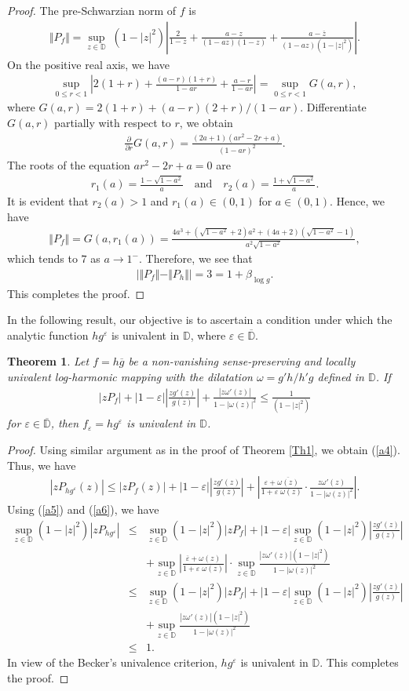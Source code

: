 \documentclass[12pt,reqno]{amsart}
\newtheorem{thm}{Theorem}[section]
\newtheorem{open problem}{Open problem}[section]
\newcommand{\ol}{\overline}
\newcommand{\beas}{\begin{eqnarray*}}
\newcommand{\eeas}{\end{eqnarray*}}
\newcommand{\bea}{\begin{eqnarray}}
\newcommand{\eea}{\end{eqnarray}}
\renewcommand{\epsilon}{\varepsilon}
\numberwithin{equation}{section}
\begin{document}
\begin{proof}
The pre-Schwarzian norm of $f$ is 
\beas\Vert P_f\Vert=\sup_{z\in\mathbb{D}}\;(1-|z|^2)\left|\frac{2}{1-z}+\frac{a-z}{(1-az)(1-z)}+\frac{a-\ol{z}}{(1-az)(1-|z|^2)}\right|.\eeas
On the positive real axis, we have 
\beas \sup_{0\leq r<1}\left|2(1+r)+\frac{(a-r)(1+r)}{1-a r}+\frac{a-r}{1-a r}\right|=\sup_{0\leq r<1}G(a, r),\eeas
where $G(a,r)=2(1+r)+(a-r)(2+r)/(1-a r)$. Differentiate $G(a, r)$ partially with respect to $r$, we obtain
\beas \frac{\partial }{\partial r}G(a, r)=\frac{\left(2 a+1\right)\left(a r^2-2 r+a\right)}{(1-a r)^2}.\eeas
The roots of the equation $a r^2-2 r+a=0$ are 
\beas r_1(a)=\frac{1-\sqrt{1-a^2}}{a}\quad\text{and}\quad r_2(a)=\frac{1+\sqrt{1-a^2}}{a}.\eeas
It is evident that $r_2(a)>1$ and $r_1(a)\in(0, 1)$ for $a\in(0, 1)$. Hence, we have  
\beas\Vert P_f\Vert=G(a, r_1(a))=\frac{4 a^3+\left(\sqrt{1-a^2}+2\right) a^2+(4a+2) \left(\sqrt{1-a^2}-1\right)}{a^2 \sqrt{1-a^2}},\eeas
which tends to $7$ as $a\to1^-$. Therefore, we see that 
\beas \left|\Vert P_f \Vert -\Vert P_{h}\Vert \right|=3= 1+\beta_{\log{g}}.\eeas
This completes the proof.
\end{proof}
In the following result, our objective is to ascertain a condition under which the analytic function $hg^\epsilon$ is univalent in $\mathbb{D}$, where $\epsilon\in\ol{\mathbb{D}}$.
\begin{thm}\label{Th4}
Let $f=h\overline{g}$ be a non-vanishing sense-preserving and locally univalent log-harmonic mapping with the dilatation $\omega=g'h/h'g$ defined in $\mathbb{D}$. If 
\bea\label{a5} |z P_{f}|+|1-\epsilon|\left|\frac{z g'(z)}{g(z)}\right|+\frac{|z \omega'(z)|}{1-|\omega(z)|^2}\leq \frac{1}{(1-|z|^2)}\eea
for $\epsilon\in\ol{\mathbb{D}}$, then $f_\epsilon=hg^\epsilon$ is univalent in $\mathbb{D}$.
\end{thm}
\begin{proof}
Using similar argument as in the proof of \textrm{Theorem} \ref{Th1}, we obtain (\ref{a4}). Thus, we have
\bea\label{a6}
\left|zP_{hg^{\epsilon}}(z)\right|\leq\left|zP_f(z)\right|+|1-\epsilon|\left|\frac{zg'(z)}{g(z)}\right|+\left|\frac{\epsilon+\ol{\omega(z)} }{1+\epsilon\;\omega(z) }\cdot\frac{z\omega'(z)}{1-|\omega(z)|^2}\right|.\eea
Using (\ref{a5}) and (\ref{a6}), we have
\beas \sup_{z\in\mathbb{D}}(1-|z|^2)\left|z P_{hg^\epsilon}\right|&\leq&   \sup_{z\in\mathbb{D}}(1-|z|^2)|z P_{f}|+|1-\epsilon|\sup_{z\in\mathbb{D}}(1-|z|^2)\left|\frac{z g'(z)}{g(z)}\right|\\[2mm]
&&+\sup_{z\in\mathbb{D}}\left|\frac{\ol{\epsilon}+\omega(z) }{1+\epsilon\;\omega(z) }\right|\cdot\sup_{z\in\mathbb{D}}\frac{|z \omega'(z)|(1-|z|^2)}{1-|\omega(z)|^2}\\[2mm]
&\leq& \sup_{z\in\mathbb{D}}(1-|z|^2)|z P_{f}|+|1-\epsilon|\sup_{z\in\mathbb{D}}(1-|z|^2)\left|\frac{z g'(z)}{g(z)}\right|\\[2mm]
&&+\sup_{z\in\mathbb{D}}\frac{|z \omega'(z)|(1-|z|^2)}{1-|\omega(z)|^2}\\
&\leq&1.\eeas
In view of the Becker's univalence criterion, $hg^\epsilon$ is univalent in $\mathbb{D}$. This completes the proof.
\end{proof} 
\end{document}
